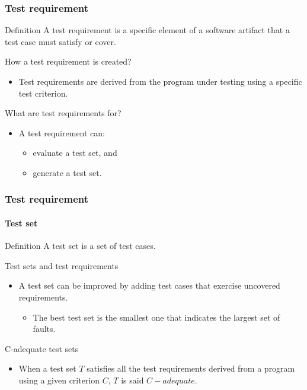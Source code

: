 \begin{frame}[parent={cmap:software-testing-foundations}, hasprev=false, hasnext=true]
\frametitle{Test requirement}
\label{concept:test-requirement}

\begin{block:concept}{Definition}
A test requirement is a specific element of a software artifact that a test
case must satisfy or cover.
\end{block:concept}

\begin{block:fact}{How a test requirement is created?}
\begin{itemize}
	\item Test requirements are derived from the program under testing using
	a specific test criterion.
\end{itemize}
\end{block:fact}

\begin{block:fact}{What are test requirements for?}
\begin{itemize}
	\item A test requirement can:
	\begin{itemize}
		\item evaluate a test set, and
		\item generate a test set.
	\end{itemize}
\end{itemize}
\end{block:fact}
\end{frame}


\begin{frame}[hasprev=true, hasnext=false]
\label{concept:test-set}
\label{concept:c-adequate-test-set}
\frametitle{Test requirement}
\framesubtitle{Test set}

\begin{block:concept}{Definition}
A test set is a set of test cases.
\end{block:concept}

\begin{block:fact}{Test sets and test requirements}
\begin{itemize}
	\item A test set can be improved by adding test cases that exercise
	uncovered requirements.
	\begin{itemize}
		\item The best test set is the smallest one that indicates the largest
		set of faults.
	\end{itemize}
\end{itemize}
\end{block:fact}

\begin{block:concept}{C-adequate test sets}
\begin{itemize}
	\item When a test set $T$ satisfies all the test requirements derived from
	a program using a given criterion $C$, $T$ is said $C-adequate$.
\end{itemize}
\end{block:concept}
\end{frame}